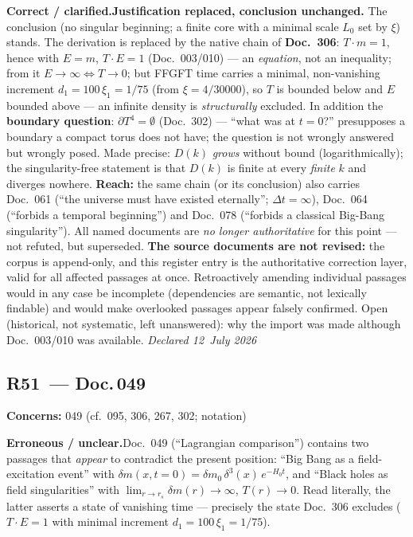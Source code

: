 \smallskip\noindent\textbf{Correct / clarified.}\quad \textbf{Justification replaced, conclusion unchanged.} The conclusion (no singular beginning; a finite core with a minimal scale $L_0$ set by $\xi$) stands. The derivation is replaced by the native chain of \textbf{Doc.~306}: $T\cdot m = 1$, hence with $E=m$, $T\cdot E = 1$ (Doc.~003/010) --- an \emph{equation}, not an inequality; from it $E\to\infty \Leftrightarrow T\to 0$; but FFGFT time carries a minimal, non-vanishing increment $d_1 = 100\,\xi_1 = 1/75$ (from $\xi=4/30000$), so $T$ is bounded below and $E$ bounded above --- an infinite density is \emph{structurally} excluded. In addition the \textbf{boundary question}: $\partial T^4=\emptyset$ (Doc.~302) --- \enquote{what was at $t=0$?} presupposes a boundary a compact torus does not have; the question is not wrongly answered but wrongly posed. Made precise: $D(k)$ \emph{grows} without bound (logarithmically); the singularity-free statement is that $D(k)$ is finite at every \emph{finite} $k$ and diverges nowhere. \textbf{Reach:} the same chain (or its conclusion) also carries Doc.~061 (\enquote{the universe must have existed eternally}; $\Delta t=\infty$), Doc.~064 (\enquote{forbids a temporal beginning}) and Doc.~078 (\enquote{forbids a classical Big-Bang singularity}). All named documents are \emph{no longer authoritative} for this point --- not refuted, but superseded. \textbf{The source documents are not revised:} the corpus is append-only, and this register entry is the authoritative correction layer, valid for all affected passages at once. Retroactively amending individual passages would in any case be incomplete (dependencies are semantic, not lexically findable) and would make overlooked passages appear falsely confirmed. Open (historical, not systematic, left unanswered): why the import was made although Doc.~003/010 was available. \emph{Declared 12~July 2026}


\medskip


\subsection*{R51~--- Doc.\,049}

\noindent\textbf{Concerns:} 049 (cf.\ 095, 306, 267, 302; notation)


\smallskip\noindent\textbf{Erroneous / unclear.}\quad Doc.~049 (\enquote{Lagrangian comparison}) contains two passages that \emph{appear} to contradict the present position: \enquote{Big Bang as a field-excitation event} with $\delta m(x,t=0)=\delta m_0\,\delta^3(x)\,e^{-H_0 t}$, and \enquote{Black holes as field singularities} with $\lim_{r\to r_s}\delta m(r)\to\infty$, $T(r)\to 0$. Read literally, the latter asserts a state of vanishing time --- precisely the state Doc.~306 excludes ($T\cdot E=1$ with minimal increment $d_1=100\,\xi_1=1/75$).


